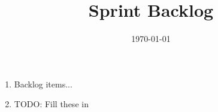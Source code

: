 \documentclass[12pt]{article}
\title{Sprint Backlog}
\date{\today}
\begin{document}
\maketitle

\begin{enumerate}
\item Backlog items...
\item TODO: Fill these in
\end{enumerate}
\end{document}
